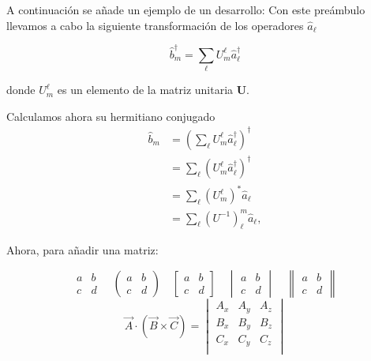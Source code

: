 \documentclass[a4paper]{article}
\begin{document}
A continuación se añade un ejemplo de un desarrollo:
Con este preámbulo llevamos a cabo la siguiente transformación de los operadores $\hat{a}_{\ell}$

\begin{equation}
\hat{b}_{m}^{\dagger}=\sum_{\ell}U_{m}^{\ell}\hat{a}_{\ell}^{\dagger}
\end{equation}

donde $U_{m}^{\ell}$ es un elemento de la matriz unitaria $\mathbf{U}$.

Calculamos ahora su hermitiano conjugado
\begin{align}
\hat{b}_{m} & =\left(\sum_{\ell}U_{m}^{\ell}\hat{a}_{\ell}^{\dagger}\right)^{\dagger}\label{eq:bm}\\
 & =\sum_{\ell}\left(U_{m}^{\ell}\hat{a}_{\ell}^{\dagger}\right)^{\dagger}\nonumber \\
 & =\sum_{\ell}\left(U_{m}^{\ell}\right)^{*}\hat{a}_{\ell}\nonumber \\
 & =\sum_{\ell}\left(U^{-1}\right)_{\ell}^{m}\hat{a}_{\ell},\label{eq:bSubM}
\end{align}

Ahora, para añadir una matriz:

$$
\begin{matrix} 
a & b \\
c & d 
\end{matrix}
\quad
\begin{pmatrix} 
a & b \\
c & d 
\end{pmatrix}
\quad
\begin{bmatrix} 
a & b \\
c & d 
\end{bmatrix}
\quad
\begin{vmatrix} 
a & b \\
c & d 
\end{vmatrix}
\quad
\begin{Vmatrix} 
a & b \\
c & d 
\end{Vmatrix}
$$
\begin{equation}
\vec{A}\cdot(\vec{B}\times\vec{C})=\begin{vmatrix}
A_x&A_y&A_z\\
B_x&B_y&B_z\\
C_x&C_y&C_z\\
\end{vmatrix}
\end{equation}
\end{document}
